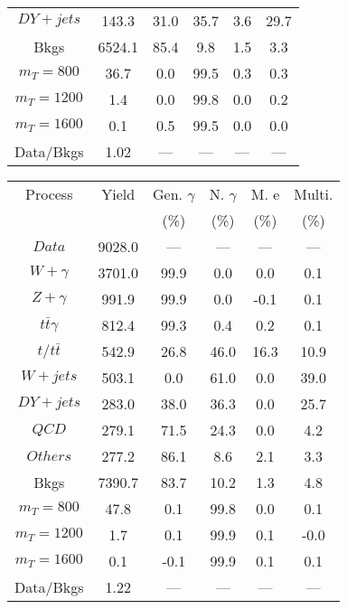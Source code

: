 \begin{figure}
\begin{minipage}[c]{0.32\textwidth}
{\begin{tabular}{cccccc}
$ DY+jets $ &  143.3 &  31.0 &  35.7 &  3.6 &  29.7\\
Bkgs &  6524.1 &  85.4 &  9.8 &  1.5 &  3.3\\
$ m_{T} = 800 $ &  36.7 &  0.0 &  99.5 &  0.3 &  0.3\\
$ m_{T} = 1200 $ &  1.4 &  0.0 &  99.8 &  0.0 &  0.2\\
$ m_{T} = 1600 $ &  0.1 &  0.5 &  99.5 &  0.0 &  0.0\\
Data/Bkgs &  1.02 &  --- &  --- &  --- &  ---\\
\hline
\end{tabular}
}
\end{minipage}
\begin{minipage}[c]{0.32\textwidth}
\centering
\tiny{
\begin{tabular}{cccccc}
\hline
Process & Yield & Gen. $\gamma$ & N. $\gamma$ & M. e & Multi. \\
 &  & (\%) & (\%) & (\%) & (\%)  \\
\hline
                                                                      $ Data $ &  9028.0 &  --- &  --- &  --- &  ---\\
$ W+\gamma $ &  3701.0 &  99.9 &  0.0 &  0.0 &  0.1\\
$ Z+\gamma $ &  991.9 &  99.9 &  0.0 &  -0.1 &  0.1\\
$ t\bar{t}\gamma $ &  812.4 &  99.3 &  0.4 &  0.2 &  0.1\\
$ t/t\bar{t} $ &  542.9 &  26.8 &  46.0 &  16.3 &  10.9\\
$ W+jets $ &  503.1 &  0.0 &  61.0 &  0.0 &  39.0\\
$ DY+jets $ &  283.0 &  38.0 &  36.3 &  0.0 &  25.7\\
$ QCD $ &  279.1 &  71.5 &  24.3 &  0.0 &  4.2\\
$ Others $ &  277.2 &  86.1 &  8.6 &  2.1 &  3.3\\
Bkgs &  7390.7 &  83.7 &  10.2 &  1.3 &  4.8\\
$ m_{T} = 800 $ &  47.8 &  0.1 &  99.8 &  0.0 &  0.1\\
$ m_{T} = 1200 $ &  1.7 &  0.1 &  99.9 &  0.1 &  -0.0\\
$ m_{T} = 1600 $ &  0.1 &  -0.1 &  99.9 &  0.1 &  0.1\\
Data/Bkgs &  1.22 &  --- &  --- &  --- &  ---\\
\hline
\end{tabular}
}
\end{minipage}
\begin{minipage}[c]{0.32\textwidth}
\centering

\end{minipage}
\end{figure}
